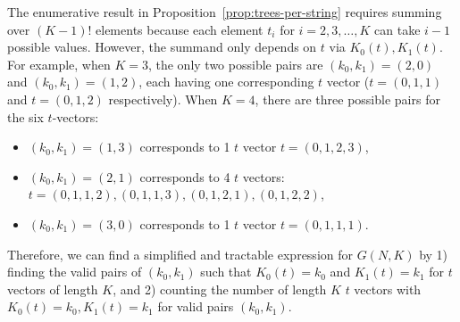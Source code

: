 \documentclass{article}
\begin{document}
The enumerative result in Proposition~\ref{prop:trees-per-string} requires summing over $(K-1)!$ elements because each element $t_i$ for $i=2,3, \ldots,K$ can take $i-1$ possible values. However, the summand only depends on $t$ via $K_0(t), K_1(t)$. For example, when $K=3$, the only two possible pairs are $(k_0,k_1)=(2,0)$ and $(k_0,k_1)=(1,2)$, each having one corresponding $t$ vector ($t=(0,1,1)$ and $t=(0,1,2)$ respectively). When $K=4$, there are three possible pairs for the six $t$-vectors: 
\begin{itemize}
    \item $(k_0,k_1)=(1,3)$ corresponds to 1 $t$ vector $t=(0,1,2,3)$,
    \item $(k_0,k_1)=(2,1)$ corresponds to 4 $t$ vectors: $t=(0,1,1,2), (0,1,1,3), (0,1,2,1), (0,1,2,2)$, 
    \item $(k_0,k_1)=(3,0)$ corresponds to 1 $t$ vector $t=(0,1,1,1)$.
\end{itemize}
Therefore, we can find a simplified and tractable expression for $G(N,K)$ by 1) finding the valid pairs of $(k_0,k_1)$ such that $K_0(t)=k_0$ and $K_1(t)=k_1$ for $t$ vectors of length $K$, and 2) counting the number of length $K$ $t$ vectors with $K_0(t)=k_0, K_1(t)=k_1$ for valid pairs $(k_0, k_1)$. \\
\end{document}
